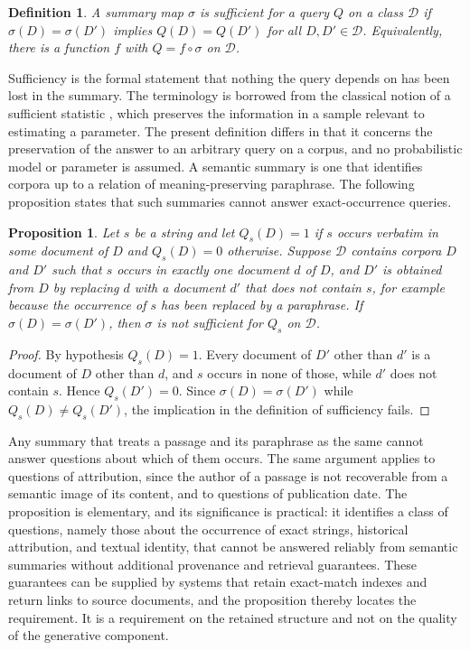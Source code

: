 \documentclass[11pt]{article}
\newtheorem{proposition}{Proposition}
\newtheorem{definition}{Definition}
\theoremstyle{remark}
\begin{document}
\begin{definition}
A summary map $\sigma$ is \emph{sufficient} for a query $Q$ on a class $\mathcal{D}$ if $\sigma(D)=\sigma(D')$ implies $Q(D)=Q(D')$ for all $D,D'\in\mathcal{D}$. Equivalently, there is a function $f$ with $Q = f\circ\sigma$ on $\mathcal{D}$.
\end{definition}

Sufficiency is the formal statement that nothing the query depends on has been lost in the summary. The terminology is borrowed from the classical notion of a sufficient statistic \cite{fisher1922}, which preserves the information in a sample relevant to estimating a parameter. The present definition differs in that it concerns the preservation of the answer to an arbitrary query on a corpus, and no probabilistic model or parameter is assumed. A semantic summary is one that identifies corpora up to a relation of meaning-preserving paraphrase. The following proposition states that such summaries cannot answer exact-occurrence queries.

\begin{proposition}\label{prop:exact}
Let $s$ be a string and let $Q_s(D)=1$ if $s$ occurs verbatim in some document of $D$ and $Q_s(D)=0$ otherwise. Suppose $\mathcal{D}$ contains corpora $D$ and $D'$ such that $s$ occurs in exactly one document $d$ of $D$, and $D'$ is obtained from $D$ by replacing $d$ with a document $d'$ that does not contain $s$, for example because the occurrence of $s$ has been replaced by a paraphrase. If $\sigma(D)=\sigma(D')$, then $\sigma$ is not sufficient for $Q_s$ on $\mathcal{D}$.
\end{proposition}

\begin{proof}
By hypothesis $Q_s(D)=1$. Every document of $D'$ other than $d'$ is a document of $D$ other than $d$, and $s$ occurs in none of those, while $d'$ does not contain $s$. Hence $Q_s(D')=0$. Since $\sigma(D)=\sigma(D')$ while $Q_s(D)\ne Q_s(D')$, the implication in the definition of sufficiency fails.
\end{proof}

Any summary that treats a passage and its paraphrase as the same cannot answer questions about which of them occurs. The same argument applies to questions of attribution, since the author of a passage is not recoverable from a semantic image of its content, and to questions of publication date. The proposition is elementary, and its significance is practical: it identifies a class of questions, namely those about the occurrence of exact strings, historical attribution, and textual identity, that cannot be answered reliably from semantic summaries without additional provenance and retrieval guarantees. These guarantees can be supplied by systems that retain exact-match indexes and return links to source documents, and the proposition thereby locates the requirement. It is a requirement on the retained structure and not on the quality of the generative component.
\end{document}

